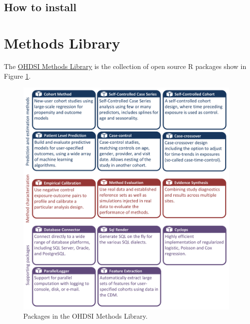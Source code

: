 \documentclass[11pt]{book}
\theoremstyle{definition}
\theoremstyle{definition}
\theoremstyle{definition}
\theoremstyle{remark}
\begin{document}
\hypertarget{how-to-install}{%
\subsection{How to install}\label{how-to-install}}

\hypertarget{methods-library}{%
\section{Methods Library}\label{methods-library}}

The \href{https://ohdsi.github.io/MethodsLibrary/}{OHDSI Methods Library} is the collection of open source R packages show in Figure \ref{fig:methodsLibrary}.

\begin{figure}

{\centering \includegraphics[width=1\linewidth]{images/OhdsiAnalyticsTools/methodsLibrary} 

}

\caption{Packages in the OHDSI Methods Library.}\label{fig:methodsLibrary}
\end{figure}
\end{document}
